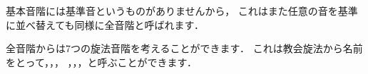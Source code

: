 \documentclass[dvipdfmx,uplatex,b5paper,openany,jbase=12Q,nomag*,textwidth-limit=44%
               ]{gachimuchi}[2020/05/05]
\begin{document}
\begin{Music}[0.95\linewidth]
  \nostartrule%
  \nostartrule%
  \Startpiece%
  \Notes{}%
  \en\setemptybar%
  \endpiece%
\end{Music}

基本音階には基準音というものがありませんから，
これはまた任意の音を基準に並べ替えても同様に全音階と呼ばれます．

全音階からは7つの旋法音階を考えることができます．
これは教会旋法から名前をとって，，，
，，，と呼ぶことができます．
\end{document}
